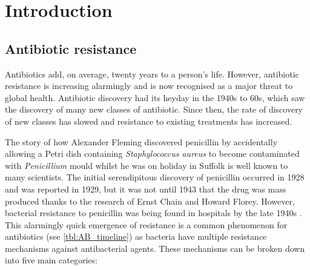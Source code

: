 \section{Introduction}

\subsection{Antibiotic resistance}

Antibiotics add, on average, twenty years to a person's life\cite{davies2013drugs}. However, antibiotic resistance is increasing alarmingly and is now recognised as a major threat to global health\cite{ResistanceUS,davies2013drugs}. Antibiotic discovery had its heyday in the 1940s to 60s, which saw the discovery of many new classes of antibiotic. Since then, the rate of discovery of new classes has slowed and resistance to existing treatments has increased.

The story of how Alexander Fleming discovered penicillin by accidentally allowing a Petri dish containing \textit{Staphylococcus aureus} to become contaminated with \textit{Penicillium} mould whilst he was on holiday in Suffolk \cite{davies2013drugs} is well known to many scientists. The initial serendipitous discovery of penicillin occurred in 1928 and was reported in 1929\cite{Fleming1929}, but it was not until 1943 that the drug was mass produced thanks to the research of Ernst Chain and Howard Florey. However, bacterial resistance to penicillin was being found in hospitals by the late 1940s \cite{Barber1947, Rountree1949}. This alarmingly quick emergence of resistance is a common phenomenon for antibiotics (see \ref{tbl:AB_timeline}) as bacteria have multiple resistance mechanisms against antibacterial agents. These mechanisms can be broken down into five main categories:


